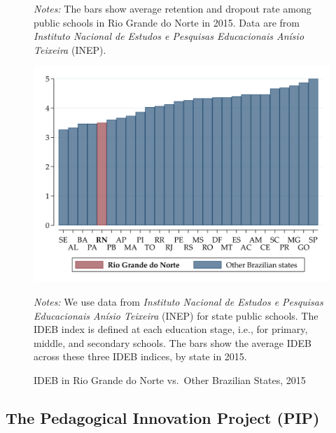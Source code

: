 \documentclass[11pt,a4paper]{article}
\begin{document}
\begin{figure}[ht!]
		\begin{minipage}{0.8\textwidth}
			\small{\textit{Notes:} The bars show average retention and dropout rate among public schools in Rio Grande do Norte in 2015. Data are from \textit{Instituto Nacional de Estudos e Pesquisas Educacionais Anísio Teixeira} (INEP).}
		\end{minipage}
	\end{figure}
	
	\begin{figure}[ht!]
		\caption{IDEB in Rio Grande do Norte vs.\ Other Brazilian States, 2015}
		\label{fig:IDEB_byState}
		\centering
		\includegraphics[width=13cm]{DataWork/Output/Figures/fig2-IDEB_byState.png}
		\begin{minipage}{0.835\textwidth}
			\small{\textit{Notes:} We use data from \textit{Instituto Nacional de Estudos e Pesquisas Educacionais Anísio Teixeira} (INEP) for state public schools. The IDEB index is defined at each education stage, i.e., for primary, middle, and secondary schools. The bars show the average IDEB across these three IDEB indices, by state in 2015.}
		\end{minipage}
	\end{figure}
	\FloatBarrier 
	
	
	\subsection{\textbf{The Pedagogical Innovation Project (PIP)}} \label{sec:pip}
	
\end{document}
